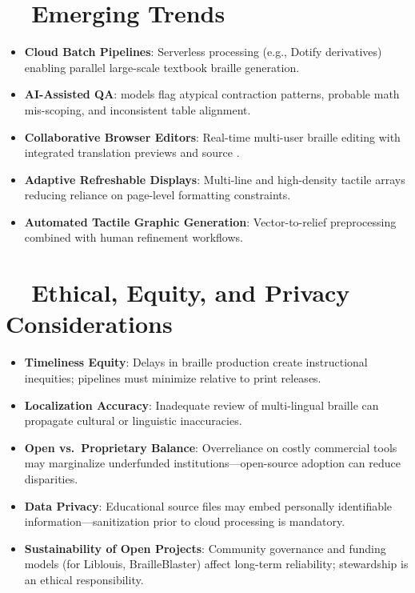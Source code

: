 \section{~~Emerging Trends}
\label{sec:braille-emerging-trends}
\begin{itemize}
	\item \textbf{Cloud Batch Pipelines}: Serverless processing (e.g., Dotify derivatives) enabling parallel large-scale textbook braille generation.
	\item \textbf{AI-Assisted QA}:  models flag atypical contraction patterns, probable math mis-scoping, and inconsistent table alignment.
	\item \textbf{Collaborative Browser Editors}: Real-time multi-user braille editing with integrated translation previews and source .
	\item \textbf{Adaptive Refreshable Displays}: Multi-line and high-density tactile arrays reducing reliance on page-level formatting constraints.
	\item \textbf{Automated Tactile Graphic Generation}: Vector-to-relief preprocessing combined with human refinement workflows.
\end{itemize}

\section{~~Ethical, Equity, and Privacy Considerations}
\label{sec:braille-ethics}
\begin{itemize}
	\item \textbf{Timeliness Equity}: Delays in braille production create instructional inequities; pipelines must minimize  relative to print releases.
	\item \textbf{Localization Accuracy}: Inadequate review of multi-lingual braille can propagate cultural or linguistic inaccuracies.
	\item \textbf{Open vs.\ Proprietary Balance}: Overreliance on costly commercial tools may marginalize underfunded institutions—open-source adoption can reduce disparities.
	\item \textbf{Data Privacy}: Educational source files may embed personally identifiable information—sanitization prior to cloud processing is mandatory.
	\item \textbf{Sustainability of Open Projects}: Community governance and funding models (for Liblouis, BrailleBlaster) affect long-term reliability; stewardship is an ethical responsibility.
\end{itemize}

